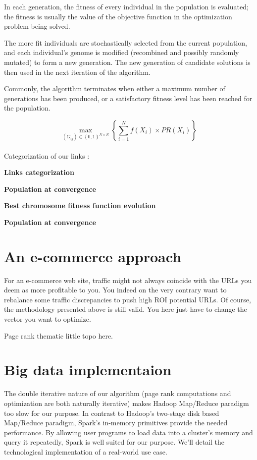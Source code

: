 \documentclass{iSWAGArticle}
\begin{document}
In each generation, the fitness of every individual in the population is evaluated; 
the fitness is usually the value of the objective function in the optimization problem being solved.
 
 The more fit individuals are stochastically selected from the current population, 
and each individual's genome is modified (recombined and possibly randomly mutated) to form a new generation. 
The new generation of candidate solutions is then used in the next iteration of the algorithm. 


Commonly, the algorithm terminates when either a maximum number of generations has been produced, 
or a satisfactory fitness level has been reached for the population.


\begin{equation}
\max_{\left(G_{ij}\right)  \in \left\{0,1\right\}^{N\times N}}\left\{ \sum^{N}_{i=1} f\left(X_i\right)\times PR(X_i)\right\}
\end{equation}
 \\\newline
Categorization of our links :

\begin{center}
\textbf{\large Links categorization}
\end{center}


\begin{center}
\textbf{\large Population at convergence}
\end{center}
\textbf{\large Best chromosome fitness function evolution}
\begin{center}
\textbf{\large Population at convergence}
\end{center}

\section{An e-commerce approach}
For an e-commerce web site, traffic might not always coincide with the URLs you deem as more profitable to you.
You indeed on the very contrary want to rebalance some traffic discrepancies to push high ROI potential URLs.
Of course, the methodology presented above is still valid. You here just have to change the vector you want to
optimize.


Page rank thematic little topo here.

\section{Big data implementaion}
The double iterative nature of our algorithm (page rank computations and optimization are both naturally iterative)
makes Hadoop Map/Reduce paradigm too slow for our purpose. 
In contrast to Hadoop's two-stage disk based Map/Reduce paradigm, Spark's in-memory primitives provide the needed performance.
By allowing user programs to load data into a cluster's memory and query it repeatedly, Spark is well suited for our purpose.
We'll detail the technological implementation of a real-world use case.





\end{document}
